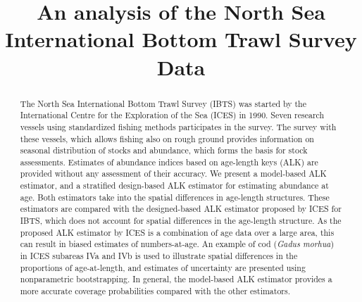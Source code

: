 \documentclass[a4paper 12pt]{article}
\title{\bf 
}
\author{}
\date{}
\numberwithin{equation}{section}
\begin{document}
\title{An analysis of the North Sea International Bottom Trawl Survey Data}

\maketitle


\begin{abstract}
The North Sea International Bottom Trawl Survey (IBTS) was started by the International Centre for the  Exploration of the Sea (ICES) in 1990. Seven research vessels using standardized fishing methods participates in the survey. The survey with these vessels, which allows fishing also on rough ground provides information on seasonal distribution of stocks and abundance,  which forms the basis for stock assessments. Estimates of abundance indices based on age-length keys (ALK) are provided without any assessment of their accuracy.  We present a model-based ALK estimator, and a stratified design-based ALK estimator for estimating abundance at age. Both estimators take into the spatial differences in age-length structures. These estimators are compared with the designed-based ALK estimator proposed by ICES for IBTS, which does not account for spatial differences in the age-length structure. As the proposed ALK estimator by ICES is a combination of age data over a large area, this can result in biased estimates of numbers-at-age. An example of cod (\emph{Gadus morhua}) in ICES subareas IVa and IVb is used to illustrate spatial differences in the proportions of age-at-length, and estimates of uncertainty are presented using nonparametric bootstrapping. In general, the model-based ALK estimator provides a more accurate coverage probabilities compared with the other estimators.  





\end{abstract}
\end{document}
